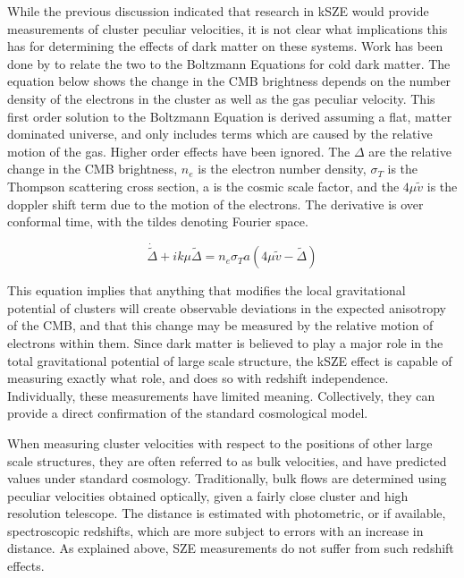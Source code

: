 \documentclass[manuscript]{aastex}
\begin{document}
While the previous discussion indicated that research in kSZE would provide measurements of cluster peculiar velocities, it is not clear what implications this has for determining the effects of dark matter on these systems. Work has been done by \cite{Dodelson1995} to relate the two to the Boltzmann Equations for cold dark matter. The equation below shows the change in the CMB brightness depends on the number density of the electrons in the cluster as well as the gas peculiar velocity. This first order solution to the Boltzmann Equation is derived assuming a flat, matter dominated universe, and only includes terms which are caused by the relative motion of the gas. Higher order effects have been ignored. The $\Delta$ are the relative change in the CMB brightness, $n_{e}$ is the electron number density, $\sigma_{T}$ is the Thompson scattering cross section, a is the cosmic scale factor, and the $4 \mu \tilde v$ is the doppler shift term due to the motion of the electrons. The derivative is over conformal time, with the tildes denoting Fourier space. 

\begin{equation}
\dot{\tilde \Delta} + ik\mu \tilde\Delta = n_{e} \sigma_{T} a (4 \mu \tilde v - \tilde \Delta)
\end{equation}

This equation implies that anything that modifies the local gravitational potential of clusters will create observable deviations in the expected anisotropy of the CMB, and that this change may be measured by the relative motion of electrons within them. Since dark matter is believed to play a major role in the total gravitational potential of large scale structure, the kSZE effect is capable of measuring exactly what role, and does so with redshift independence. Individually, these measurements have limited meaning. Collectively, they can provide a direct confirmation of the standard cosmological model.

When measuring cluster velocities with respect to the positions of other large scale structures, they are often referred to as bulk velocities, and have predicted values under standard cosmology.  Traditionally, bulk flows are determined using peculiar velocities obtained optically, given a fairly close cluster and high resolution telescope. The distance is estimated with photometric, or if available, spectroscopic redshifts, which are more subject to errors with an increase in distance. As explained above, SZE measurements do not suffer from such redshift effects.
\end{document}
